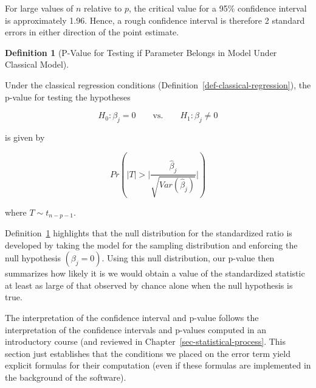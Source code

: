 \documentclass[
  letterpaper,
  DIV=11,
  numbers=noendperiod]{scrreprt}
\theoremstyle{definition}
\theoremstyle{definition}
\newtheorem{definition}{Definition}[chapter]
\theoremstyle{remark}
\begin{document}
\begin{tcolorbox}[enhanced jigsaw, bottomrule=.15mm, titlerule=0mm, bottomtitle=1mm, colback=white, coltitle=black, rightrule=.15mm, leftrule=.75mm, toprule=.15mm, toptitle=1mm, left=2mm, opacityback=0, colframe=quarto-callout-note-color-frame, breakable, title=\textcolor{quarto-callout-note-color}{\faInfo}\hspace{0.5em}{Note}, arc=.35mm, colbacktitle=quarto-callout-note-color!10!white, opacitybacktitle=0.6]

For large values of \(n\) relative to \(p\), the critical value for a
95\% confidence interval is approximately 1.96. Hence, a rough
confidence interval is therefore 2 standard errors in either direction
of the point estimate.

\end{tcolorbox}

\begin{definition}[P-Value for Testing if Parameter Belongs in Model
Under Classical
Model]\protect\hypertarget{def-classical-p}{}\label{def-classical-p}

Under the classical regression conditions
(Definition~\ref{def-classical-regression}), the p-value for testing the
hypotheses

\[H_0: \beta_j = 0 \qquad \text{vs.} \qquad H_1: \beta_j \neq 0\]

is given by

\[Pr\left(\lvert T\rvert > \lvert\frac{\widehat{\beta}_j}{\sqrt{Var\left(\widehat{\beta}_j\right)}}\rvert\right)\]

where \(T \sim t_{n-p-1}\).

\end{definition}

Definition~\ref{def-classical-p} highlights that the null distribution
for the standardized ratio is developed by taking the model for the
sampling distribution and enforcing the null hypothesis
\(\left(\beta_j = 0\right)\). Using this null distribution, our p-value
then summarizes how likely it is we would obtain a value of the
standardized statistic at least as large of that observed by chance
alone when the null hypothesis is true.

The interpretation of the confidence interval and p-value follows the
interpretation of the confidence intervals and p-values computed in an
introductory course (and reviewed in
Chapter~\ref{sec-statistical-process}. This section just establishes
that the conditions we placed on the error term yield explicit formulas
for their computation (even if these formulas are implemented in the
background of the software).
\end{document}
